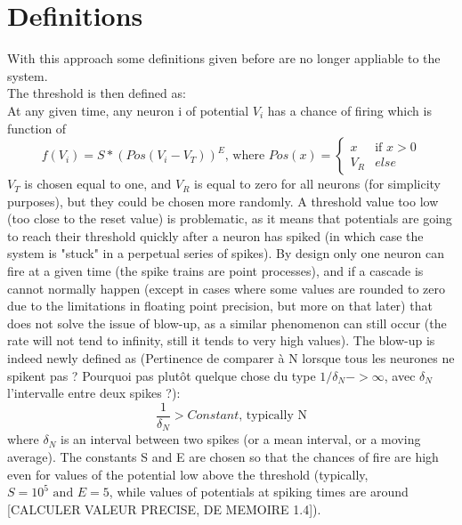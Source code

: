 \section{Definitions}
	With this approach some definitions given before are no longer appliable to the system.\\
	The threshold is then defined as:\\
		At any given time, any neuron i of potential $V_i$ has a chance of firing which is function of
		\begin{equation*}
			f(V_i)=S*(Pos(V_i-V_T))^E\text{, where }Pos(x)=\begin{cases}x & \text{if }x>0\\V_R & else\end{cases}
		\end{equation*}
	$V_T$ is chosen equal to one, and $V_R$ is equal to zero for all neurons (for simplicity purposes), but they could be chosen more randomly. A threshold value too low (too close to the reset value) is problematic, as it means that potentials are going to reach their threshold quickly after a neuron has spiked (in which case the system is "stuck" in a perpetual series of spikes). By design only one neuron can fire at a given time (the spike trains are point processes), and if a cascade is cannot normally happen (except in cases where some values are rounded to zero due to the limitations in floating point precision, but more on that later) that does not solve the issue of blow-up, as a similar phenomenon can still occur (the rate will not tend to infinity, still it tends to very high values). The blow-up is indeed newly defined as (Pertinence de comparer \`a N lorsque tous les neurones ne spikent pas ? Pourquoi pas plut\^ot quelque chose du type $1/\delta_N->\infty$, avec $\delta_N$ l'intervalle entre deux spikes ?):
	\[
		\frac{1}{\delta_N}>Constant\text{, typically N}
	\]
	where $\delta_N$ is an interval between two spikes (or a mean interval, or a moving average). The constants S and E are chosen so that the chances of fire are high even for values of the potential low above the threshold (typically, $S=10^5\text{ and }E=5$, while values of potentials at spiking times are around [CALCULER VALEUR PRECISE, DE MEMOIRE 1.4]).

